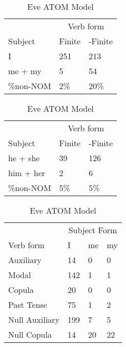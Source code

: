 \begin{table}[]
\caption{Eve ATOM Model}
\begin{minipage}{0.5\textwidth}
    \centering
    \begin{tabular}{@{}lll@{}}
        \toprule
         & \multicolumn{2}{c}{Verb form}\\
         \cline{2-3}
        Subject & Finite & -Finite \\
        \midrule
        I & 251 & 213 \\
        me + my & 5 & 54 \\
        \hline
        \%non-NOM & 2\% & 20\% \\
        \bottomrule
    \end{tabular}
\end{minipage}
\begin{minipage}{0.5\textwidth}
    \centering
    \begin{tabular}{@{}lll@{}}
        \toprule
         & \multicolumn{2}{c}{Verb form}\\
         \cline{2-3}
        Subject & Finite & -Finite \\
        \midrule
        he + she & 39 & 126 \\
        him + her & 2 & 6 \\
        \hline
        \%non-NOM & 5\% & 5\% \\
        \bottomrule
    \end{tabular}
    \end{minipage}
\begin{minipage}{0.5\textwidth}
    \centering
    \begin{tabular}{@{}llll@{}}
        \toprule
            &\multicolumn{3}{c}{Subject Form}\\
            \cline{2-4}
        Verb form & I & me & my \\
        \midrule
        Auxiliary & 14 & 0 & 0 \\
        Modal & 142 & 1 & 1 \\
        Copula & 20 & 0 & 0 \\
        Past Tense & 75 & 1 & 2 \\
        \hline
        Null Auxiliary & 199 & 7 & 5 \\
        Null Copula & 14 & 20 & 22 \\
        \bottomrule
    \end{tabular}
\end{minipage}

\end{table}
